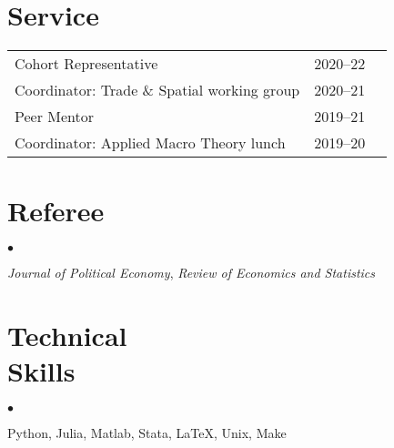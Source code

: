 \documentclass[margin,line]{res}
\newenvironment{list0}{
  \begin{list}{$\bullet$}{%
      \setlength{\itemsep}{0in}
      \setlength{\parsep}{0in} \setlength{\parskip}{0in}
      \setlength{\topsep}{0in} \setlength{\partopsep}{0in}
      \setlength{\leftmargin}{0.0in}}}{\end{list}}
\begin{document}
\begin{resume}

\section{\sc Service}

\begin{tabular}{@{}lll}
    Cohort Representative & 2020--22 \\
    Coordinator: Trade \& Spatial working group & 2020--21 \\
    Peer Mentor & 2019--21 \\
    Coordinator: Applied Macro Theory lunch & 2019--20 \\
\end{tabular}

\vspace*{-1.5mm}


\section{\sc Referee}
\begin{list0}
    \item[]
    \textit{Journal of Political Economy},
    \textit{Review of Economics and Statistics}
\end{list0}


\section{\sc Technical \\ Skills}
\begin{list0}
    \item[] Python, Julia, Matlab, Stata, \LaTeX, Unix, Make
\end{list0}

\end{resume}
\end{document}

